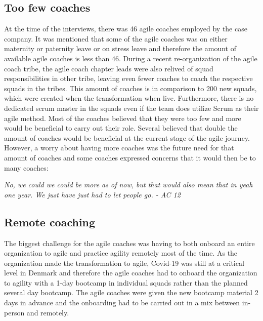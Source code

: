 \documentclass[11pt,a4paper]{report}
\begin{document}
\subsection{Too few coaches}
At the time of the interviews, there was 46 agile coaches employed by the case company. It was mentioned that some of the agile coaches was on either maternity or paternity leave or on stress leave and therefore the amount of available agile coaches is less than 46. During a recent re-organization of the agile coach tribe, the agile coach chapter leads were also relived of squad responsibilities in other tribe, leaving even fewer coaches to coach the respective squads in the tribes. This amount of coaches is in comparison to 200 new squads, which were created when the transformation when live. Furthermore, there is no dedicated scrum master in the squads even if the team does utilize Scrum as their agile method. 
Most of the coaches believed that they were too few and more would be beneficial to carry out their role. Several believed that double the amount of coaches would be beneficial at the current stage of the agile journey. However, a worry about having more coaches was the future need for that amount of coaches and some coaches expressed concerns that it would then be to many coaches:

\begin{displayquote}
\textit{
No, we could we could be more as of now, but that would also mean that in yeah one year. We just have just had to let people go. - AC 12
}
\end{displayquote}

\subsection{Remote coaching}
The biggest challenge for the agile coaches was having to both onboard an entire organization to agile and practice agility remotely most of the time. As the organization made the transformation to agile, Covid-19 was still at a critical level in Denmark and therefore the agile coaches had to onboard the organization to agility with a 1-day bootcamp in individual squads rather than the planned several day bootcamp. The agile coaches were given the new bootcamp material 2 days in advance and the onboarding had to be carried out in a mix between in-person and remotely.
\end{document}

